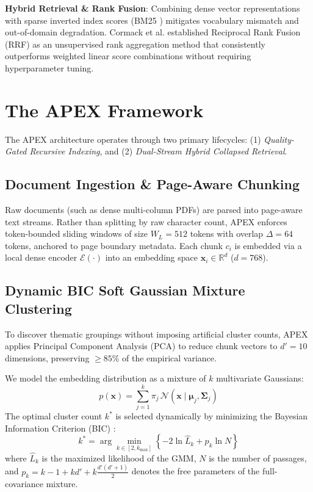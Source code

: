 \documentclass[11pt,a4paper]{article}
\begin{document}
\textbf{Hybrid Retrieval & Rank Fusion}: Combining dense vector representations with sparse inverted index scores (BM25 \cite{robertson2009probabilistic}) mitigates vocabulary mismatch and out-of-domain degradation. Cormack et al. \cite{cormack2009reciprocal} established Reciprocal Rank Fusion (RRF) as an unsupervised rank aggregation method that consistently outperforms weighted linear score combinations without requiring hyperparameter tuning.

\section{The APEX Framework}
\label{sec:framework}

The APEX architecture operates through two primary lifecycles: (1) \textit{Quality-Gated Recursive Indexing}, and (2) \textit{Dual-Stream Hybrid Collapsed Retrieval}.

\subsection{Document Ingestion & Page-Aware Chunking}
Raw documents (such as dense multi-column PDFs) are parsed into page-aware text streams. Rather than splitting by raw character count, APEX enforces token-bounded sliding windows of size $W_L = 512$ tokens with overlap $\Delta = 64$ tokens, anchored to page boundary metadata. Each chunk $c_i$ is embedded via a local dense encoder $\mathcal{E}(\cdot)$ into an embedding space $\mathbf{x}_i \in \mathbb{R}^d$ ($d = 768$).

\subsection{Dynamic BIC Soft Gaussian Mixture Clustering}
To discover thematic groupings without imposing artificial cluster counts, APEX applies Principal Component Analysis (PCA) to reduce chunk vectors to $d' = 10$ dimensions, preserving $\ge 85\%$ of the empirical variance.

We model the embedding distribution as a mixture of $k$ multivariate Gaussians:
\begin{equation}
    p(\mathbf{x}) = \sum_{j=1}^k \pi_j \, \mathcal{N}(\mathbf{x} \mid \boldsymbol{\mu}_j, \boldsymbol{\Sigma}_j)
\end{equation}
The optimal cluster count $k^*$ is selected dynamically by minimizing the Bayesian Information Criterion (BIC) \cite{schwarz1978estimating}:
\begin{equation}
    k^* = \arg\min_{k \in [2, k_{\max}]} \left\{ -2 \ln \hat{L}_k + p_k \ln N \right\}
\end{equation}
where $\hat{L}_k$ is the maximized likelihood of the GMM, $N$ is the number of passages, and $p_k = k - 1 + k d' + k \frac{d'(d'+1)}{2}$ denotes the free parameters of the full-covariance mixture.
\end{document}
